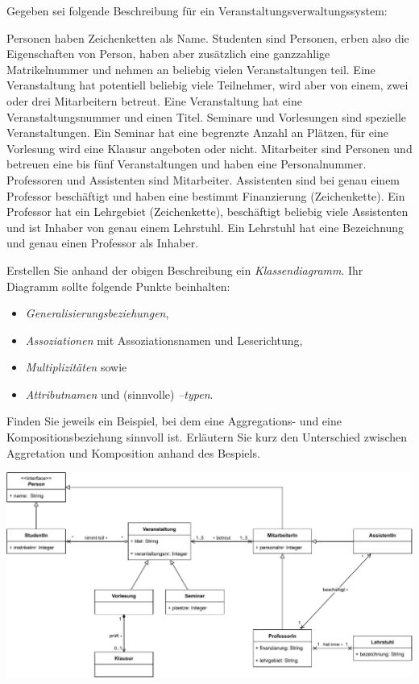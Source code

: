 \documentclass{abgabe}
\begin{document}
\begin{questions}

    Gegeben sei folgende Beschreibung für ein Veranstaltungsverwaltungssystem:

    Personen haben Zeichenketten als Name.
    Studenten sind Personen, erben also die Eigenschaften von Person, haben aber zusätzlich eine ganzzahlige Matrikelnummer und nehmen an beliebig vielen Veranstaltungen teil.
    Eine Veranstaltung hat potentiell beliebig viele Teilnehmer, wird aber von einem, zwei oder drei Mitarbeitern betreut.
    Eine Veranstaltung hat eine Veranstaltungsnummer und einen Titel.
    Seminare und Vorlesungen sind spezielle Veranstaltungen.
    Ein Seminar hat eine begrenzte Anzahl an Plätzen, für eine Vorlesung wird eine Klausur angeboten oder nicht.
    Mitarbeiter sind Personen und betreuen eine bis fünf Veranstaltungen und haben eine Personalnummer.
    Professoren und Assistenten sind Mitarbeiter.
    Assistenten sind bei genau einem Professor beschäftigt und haben eine bestimmt Finanzierung (Zeichenkette).
    Ein Professor hat ein Lehrgebiet (Zeichenkette), beschäftigt beliebig viele Assistenten und ist Inhaber von genau einem Lehrstuhl.
    Ein Lehrstuhl hat eine Bezeichnung und genau einen Professor als Inhaber.

    Erstellen Sie anhand der obigen Beschreibung ein \emph{Klassendiagramm}.
    Ihr Diagramm sollte folgende Punkte beinhalten:
    \begin{itemize}
        \item \emph{Generalisierungsbeziehungen},
        \item \emph{Assoziationen} mit Assoziationsnamen und Leserichtung,
        \item \emph{Multiplizitäten} sowie
        \item \emph{Attributnamen} und (sinnvolle) \emph{–typen}.
    \end{itemize}

    Finden Sie jeweils ein Beispiel, bei dem eine Aggregations- und eine Kompositionsbeziehung sinnvoll ist.
    Erläutern Sie kurz den Unterschied zwischen Aggretation und Komposition anhand des Bespiels.
    \newpage 
    \begin{solution}
        \begin{center}
            \includegraphics[width=\textwidth]{swt_h07_veranstaltungsverwaltung.pdf}
        \end{center}


\end{solution}
\end{questions}
\end{document}
